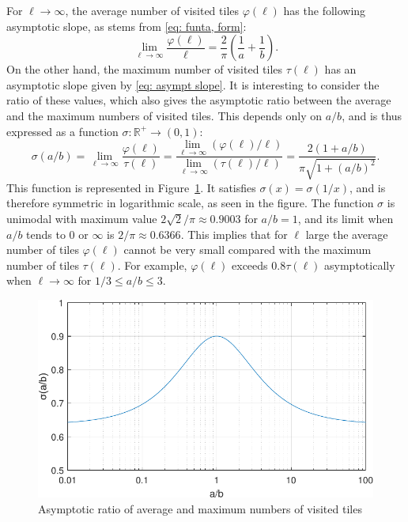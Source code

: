 \documentclass[12pt, a4paper]{article}
\newcommand{\funt}{\tau} %
\newcommand{\funta}{\varphi} %
\newcommand{\ras}{\sigma}
\newcommand{\len}{\ell} %
\begin{document}
For $\len \rightarrow \infty$, the average number of visited tiles $\funta(\len)$ has the following asymptotic slope, as stems from \eqref{eq: funta, form}:
\begin{equation}
\label{eq: asympt slope ave}
\lim_{\len \rightarrow \infty} \frac{\funta(\len)}{\len} = \frac 2 \pi \left(\frac 1 a + \frac 1 b \right).
\end{equation}
On the other hand, the maximum number of visited tiles $\funt(\len)$ has an asymptotic slope given by \eqref{eq: asympt slope}. It is interesting to consider the ratio of these values, which also gives the asymptotic ratio between the average and the maximum numbers of visited tiles. This depends only on $a/b$, and is thus expressed as a function $\ras: \mathbb R^+ \to (0,1)$:
\begin{equation}
\label{eq: ras}
\ras(a/b) = \lim_{\len \rightarrow \infty}
\frac { \funta(\len) } { \funt(\len) }
= \frac
{ \lim_{\len \rightarrow \infty} (\funta(\len)/\len) }
{ \lim_{\len \rightarrow \infty} (\funt(\len)/\len) }
= \frac{2\left(1 + a/b\right)}{\pi\sqrt{1 + \left(a/b\right)^2}}.
\end{equation}
This function is represented in Figure~\ref{fig: ratio asympt slopes}. It satisfies $\ras(x) = \ras(1/x)$, and is therefore symmetric in logarithmic scale, as seen in the figure. The function $\ras$ is unimodal with maximum value $2\sqrt 2/\pi \approx 0.9003$ for $a/b=1$, and its limit when $a/b$ tends to $0$ or $\infty$ is $2/\pi \approx 0.6366$. This implies that for $\len$ large the average number of tiles $\funta(\len)$ cannot be very small compared with the maximum number of tiles $\funt(\len)$. For example, $\funta(\len)$ exceeds $0.8\funt(\len)$ asymptotically when $\len \rightarrow \infty$ for $1/3 \leq a/b \leq 3$.

\begin{figure}
\centering%
\includegraphics[width=.7\textwidth]{ratio_asympt_slopes}%
\caption{Asymptotic ratio of average and maximum numbers of visited tiles
}%
\label{fig: ratio asympt slopes}%
\end{figure}%
\end{document}
